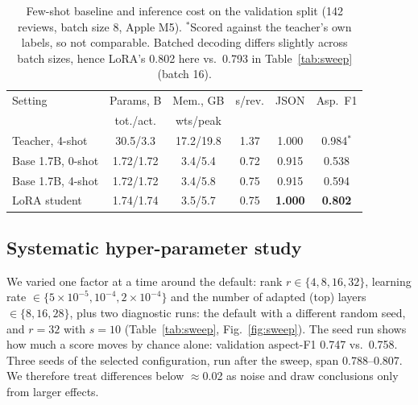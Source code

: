 \documentclass[journal]{IEEEtran}
\begin{document}
\begin{table}[t]
\centering
\caption{Few-shot baseline and inference cost on the validation split (142 reviews, batch size 8, Apple M5).
$^*$Scored against the teacher's own labels, so not comparable. Batched decoding differs slightly across batch
sizes, hence LoRA's 0.802 here vs.\ 0.793 in Table~\ref{tab:sweep} (batch 16).}
\label{tab:cost}
\setlength{\tabcolsep}{2.5pt}
\begin{tabular}{lccccc}
\toprule
Setting & Params, B & Mem., GB & s/rev. & JSON & Asp.\ F1 \\
 & tot./act. & wts/peak & & & \\
\midrule
Teacher, 4-shot & 30.5/3.3 & 17.2/19.8 & 1.37 & 1.000 & 0.984$^*$ \\
Base 1.7B, 0-shot & 1.72/1.72 & 3.4/5.4 & 0.72 & 0.915 & 0.538 \\
Base 1.7B, 4-shot & 1.72/1.72 & 3.4/5.8 & 0.75 & 0.915 & 0.594 \\
LoRA student & 1.74/1.74 & 3.5/5.7 & 0.75 & \textbf{1.000} & \textbf{0.802} \\
\bottomrule
\end{tabular}
\end{table}

\subsection{Systematic hyper-parameter study}
\label{sec:sweep}
We varied one factor at a time around the default: rank $r\in\{4,8,16,32\}$, learning rate
$\in\{5{\times}10^{-5},10^{-4},2{\times}10^{-4}\}$ and the number of adapted (top) layers $\in\{8,16,28\}$, plus two
diagnostic runs: the default with a different random seed, and $r=32$ with $s=10$ (Table~\ref{tab:sweep},
Fig.~\ref{fig:sweep}). The seed run shows how much a score moves by chance alone: validation aspect-F1 0.747 vs.\
0.758. Three seeds of the selected configuration, run after the sweep, span 0.788--0.807. We therefore treat differences
below $\approx$0.02 as noise and draw conclusions only from larger effects.
\end{document}
